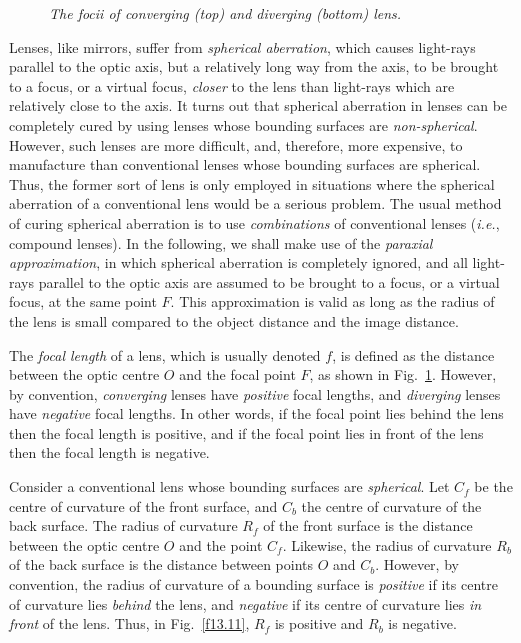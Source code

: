 \begin{figure}
\epsfysize=4in
\centerline{}
\caption{\em The focii of converging (top) and diverging (bottom) lens.}\label{f13.10}
\end{figure}

Lenses, like mirrors,
 suffer from {\em spherical aberration}, which causes
light-rays parallel to the optic axis, but a relatively long way from
the axis, to be brought to a focus, or a virtual focus, {\em closer}\/ to the
lens than light-rays which are relatively close to the axis. It turns out that
spherical aberration in lenses can be completely cured by using lenses
whose bounding surfaces are {\em non-spherical}. However, such lenses
are more difficult, and, therefore,  more expensive, to manufacture than
conventional  lenses
whose bounding surfaces are spherical. Thus, the former sort of lens is only
employed in situations where the spherical aberration of a  conventional
lens would be a serious problem. The usual method of curing
spherical aberration is to use {\em combinations}\/ of conventional
lenses ({\em i.e.}, compound lenses). 
In the
following, we shall make use  of the {\em  paraxial approximation}, in which
spherical aberration is completely ignored, and all light-rays parallel
to the optic axis are assumed to be brought to a focus, or a virtual
focus, at the same point $F$. This approximation is valid as long
as the radius of the lens is small compared to the object distance
and the image distance.

The {\em focal length}\/ of a lens, which is usually denoted $f$, is
defined as the distance between the optic centre $O$ and the focal
point $F$, as shown in Fig.~\ref{f13.10}. However, by convention, {\em converging}\/ lenses have 
{\em positive}\/
focal lengths, and {\em diverging}\/ lenses have {\em negative}\/ focal lengths. In other
words, if the focal point lies behind the lens then the focal length is
positive, and if the focal point lies in front of the lens then the focal
length is negative. 

Consider a conventional lens whose bounding surfaces are {\em spherical}.
Let $C_f$ be the centre of curvature of the front
surface, and $C_b$ the centre of curvature of the back surface.
The radius of curvature  $R_f$ of the front surface is the
distance between the optic centre $O$ and the point $C_f$. Likewise,
the radius of curvature $R_b$ of the back surface is the distance
between points $O$ and $C_b$. However, by convention, the
radius of curvature of a bounding surface is {\em positive}\/ if its centre of
curvature lies {\em  behind} the lens, and {\em negative}\/ if its centre of
curvature lies {\em in front}
 of the lens. Thus, in Fig.~\ref{f13.11},
$R_f$ is positive and $R_b$ is negative.

